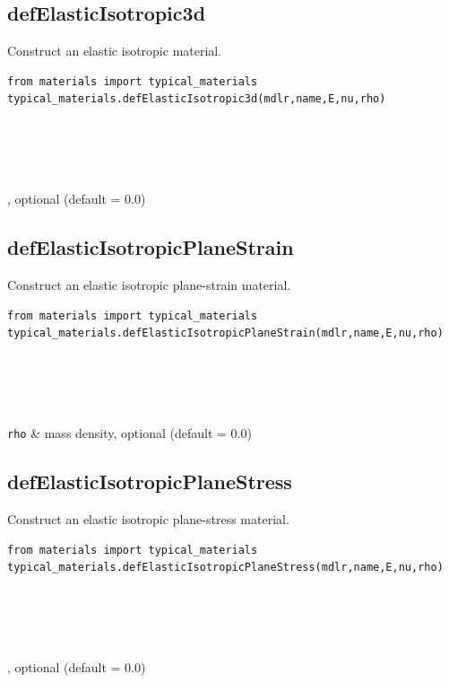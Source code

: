 \subsection{defElasticIsotropic3d}
\noindent Construct an elastic isotropic material.
\begin{verbatim}
from materials import typical_materials
typical_materials.defElasticIsotropic3d(mdlr,name,E,nu,rho)
\end{verbatim}
\begin{paramFuncTable}
\mdlr{} \\
\\
\E{} \\
\nuX{} \\
\rhoX{}, optional (default = 0.0)\\
\end{paramFuncTable}


\subsection{defElasticIsotropicPlaneStrain}
\noindent Construct an elastic isotropic plane-strain material.
\begin{verbatim}
from materials import typical_materials
typical_materials.defElasticIsotropicPlaneStrain(mdlr,name,E,nu,rho)
\end{verbatim}
\begin{paramFuncTable}\mdlr{} \\
\\
\E{} \\
\nuX \\
{\tt rho} &  mass density, optional (default = 0.0)\\
\end{paramFuncTable}


\subsection{defElasticIsotropicPlaneStress}
\noindent Construct an elastic isotropic plane-stress material.
\begin{verbatim}
from materials import typical_materials
typical_materials.defElasticIsotropicPlaneStress(mdlr,name,E,nu,rho)
\end{verbatim}
\begin{paramFuncTable}
\mdlr{} \\
\\
\E{} \\
\nuX{} \\
\rhoX{} , optional (default = 0.0)\\
\end{paramFuncTable}

